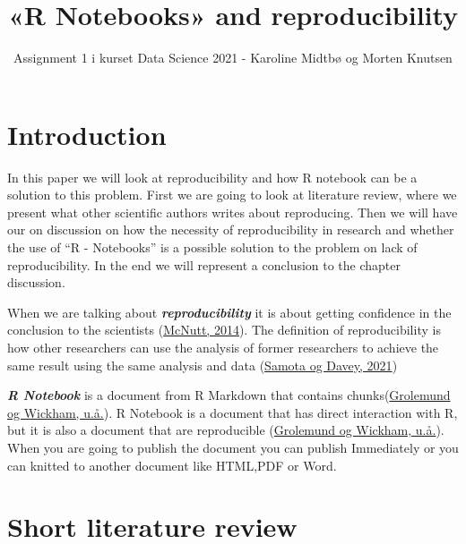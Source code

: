 \documentclass[
  12pt,
  norsk,
]{article}
\title{«R Notebooks» and reproducibility}
\author{Assignment 1 i kurset Data Science 2021 - Karoline Midtbø og
Morten Knutsen}
\date{}
\begin{document}
\maketitle

\hypertarget{introduction}{%
\section{Introduction}\label{introduction}}

In this paper we will look at reproducibility and how R notebook can be
a solution to this problem. First we are going to look at literature
review, where we present what other scientific authors writes about
reproducing. Then we will have our on discussion on how the necessity of
reproducibility in research and whether the use of ``R - Notebooks'' is
a possible solution to the problem on lack of reproducibility. In the
end we will represent a conclusion to the chapter discussion.

When we are talking about \textbf{\emph{reproducibility}} it is about
getting confidence in the conclusion to the scientists
(\protect\hyperlink{ref-mcnutt2014}{McNutt, 2014}). The definition of
reproducibility is how other researchers can use the analysis of former
researchers to achieve the same result using the same analysis and data
(\protect\hyperlink{ref-samota2021}{Samota og Davey, 2021})

\textbf{\emph{R Notebook}} is a document from R Markdown that contains
chunks(\protect\hyperlink{ref-grolemund}{Grolemund og Wickham, u.å.}). R
Notebook is a document that has direct interaction with R, but it is
also a document that are reproducible
(\protect\hyperlink{ref-grolemund}{Grolemund og Wickham, u.å.}). When
you are going to publish the document you can publish Immediately or you
can knitted to another document like HTML,PDF or Word.

\hypertarget{short-literature-review}{%
\section{Short literature review}\label{short-literature-review}}
\end{document}
